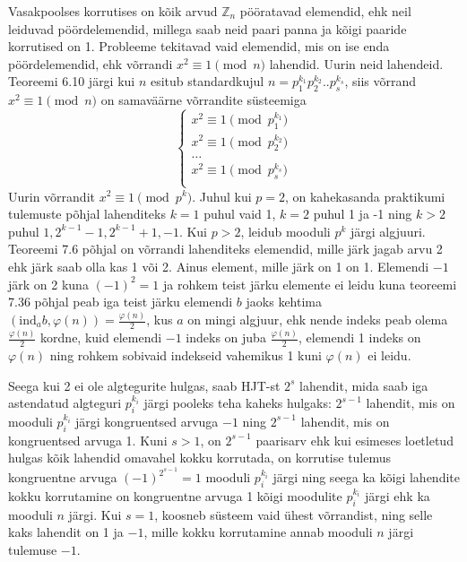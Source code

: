 \documentclass[a4paper, 10pt]{article}
\newcommand{\Z}{\mathbb{Z}}
\begin{document}
Vasakpoolses korrutises on kõik arvud $\Z_n$ pööratavad elemendid, ehk neil leiduvad pöördelemendid, millega saab neid paari panna ja kõigi paaride korrutised on 1. Probleeme tekitavad vaid elemendid, mis on ise enda pöördelemendid, ehk võrrandi $x^2\equiv1\pmod n$ lahendid. Uurin neid lahendeid. Teoreemi 6.10 järgi kui $n$ esitub standardkujul $n=p_1^{k_1}p_2^{k_2}..p_s^{k_s}$, siis võrrand $x^2\equiv1\pmod n$ on samaväärne võrrandite süsteemiga
$$\begin{cases}x^2\equiv1\pmod{p_1^{k_1}}\\x^2\equiv1\pmod{p_2^{k_2}}\\\dots\\x^2\equiv1\pmod{p_s^{k_s}}\\\end{cases}$$
Uurin võrrandit $x^2\equiv1\pmod {p^k}$. Juhul kui $p=2$, on kahekasanda praktikumi tulemuste põhjal lahenditeks $k=1$ puhul vaid 1, $k=2$ puhul 1 ja -1 ning $k>2$ puhul $1, 2^{k-1}-1, 2^{k-1}+1,-1$. Kui $p>2$, leidub mooduli $p^k$ järgi algjuuri. Teoreemi 7.6 põhjal on võrrandi lahenditeks elemendid, mille järk jagab arvu 2 ehk järk saab olla kas 1 või 2. Ainus element, mille järk on 1 on 1. Elemendi $-1$ järk on 2 kuna $(-1)^2=1$ ja rohkem teist järku elemente ei leidu kuna teoreemi 7.36 põhjal peab iga teist järku elemendi $b$ jaoks kehtima $(\text{ind}_{a}b,\varphi(n))=\frac{\varphi(n)}{2}$, kus $a$ on mingi algjuur, ehk nende indeks peab olema $\frac{\varphi(n)}2$ kordne, kuid elemendi $-1$ indeks on juba $\frac{\varphi(n)}2$, elemendi 1 indeks on $\varphi(n)$ ning rohkem sobivaid indekseid vahemikus 1 kuni $\varphi(n)$ ei leidu.

Seega kui 2 ei ole algtegurite hulgas, saab HJT-st $2^s$ lahendit, mida saab iga astendatud algteguri $p_i^{k_i}$ järgi pooleks teha kaheks hulgaks: $2^{s-1}$ lahendit, mis on mooduli $p_i^{k_i}$ järgi kongruentsed arvuga $-1$ ning $2^{s-1}$ lahendit, mis on kongruentsed arvuga 1. Kuni $s>1$, on $2^{s-1}$ paarisarv ehk kui esimeses loetletud hulgas kõik lahendid omavahel kokku korrutada, on korrutise tulemus kongruentne arvuga $(-1)^{2^{s-1}}=1$ mooduli $p_i^{k_i}$ järgi ning seega ka kõigi lahendite kokku korrutamine on kongruentne arvuga 1 kõigi moodulite $p_i^{k_i}$ järgi ehk ka mooduli $n$ järgi. Kui $s=1$, koosneb süsteem vaid ühest võrrandist, ning selle kaks lahendit on 1 ja $-1$, mille kokku korrutamine annab mooduli $n$ järgi tulemuse $-1$.
\end{document}
